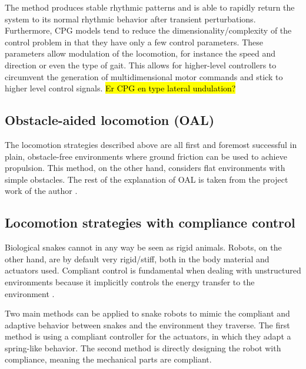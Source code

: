 The method produces stable rhythmic patterns and is able to rapidly return the system to its normal rhythmic behavior after transient perturbations. Furthermore, CPG models tend to reduce the dimensionality/complexity of the control problem in that they have only a few control parameters. These parameters allow modulation of the locomotion, for instance the speed and direction or even the type of gait. This allows for higher-level controllers to circumvent the generation of multidimensional motor commands and stick to higher level control signals.
\hl{Er CPG en type lateral undulation?}

\subsection{Obstacle-aided locomotion (OAL)}

The locomotion strategies described above are all first and foremost successful in plain, obstacle-free environments where ground friction can be used to achieve propulsion. This method, on the other hand, considers flat environments with simple obstacles. The rest of the explanation of OAL is taken from the project work of the author \cite{AtussaProsjektoppgp}.





\subsection{Locomotion strategies with compliance control}

Biological snakes cannot in any way be seen as rigid animals. Robots, on the other hand, are by default very rigid/stiff, both in the body material and actuators used.
Compliant control is fundamental when dealing with unstructured environments because it implicitly controls the energy transfer to the environment \cite{calanca2015review}.

Two main methods can be applied to snake robots to mimic the compliant and adaptive behavior between snakes and the environment they traverse. The first method is using a compliant controller for the actuators, in which they adapt a spring-like behavior. The second method is directly designing the robot with compliance, meaning the mechanical parts are compliant.

